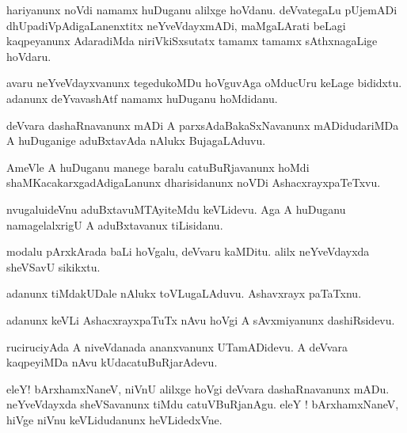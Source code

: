 \documentclass{article}
\begin{document}
\begin{mn}%
hariyanunx noVdi namamx huDuganu alilxge hoVdanu. deVvategaLu pUjemADi 
dhUpadiVpAdigaLanenxtitx neYveVdayxmADi, maMgaLArati beLagi kaqpeyanunx  AdaradiMda 
niriVkiSxsutatx tamamx tamamx sAthxnagaLige hoVdaru.
\end{mn}

\begin{mn}%
avaru neYveVdayxvanunx tegedukoMDu hoVguvAga oMducUru keLage bididxtu. adanunx 
deYvavashAtf  namamx huDuganu hoMdidanu.
\end{mn}

\begin{mn}%
deVvara dashaRnavanunx mADi A parxsAdaBakaSxNavanunx mADidudariMDa A huDuganige 
aduBxtavAda nAlukx BujagaLAduvu.
\end{mn}

\begin{mn}%
AmeVle A huDuganu manege baralu catuBuRjavanunx hoMdi shaMKacakarxgadAdigaLanunx 
dharisidanunx noVDi AshacxrayxpaTeTxvu.
\end{mn}

\begin{mn}%
nvugaluideVnu aduBxtavuMTAyiteMdu keVLidevu. Aga A huDuganu namagelalxrigU A aduBxtavanux 
tiLisidanu.
\end{mn}

\begin{mn}%
modalu pArxkArada baLi hoVgalu, deVvaru kaMDitu. alilx neYveVdayxda sheVSavU sikikxtu.
\end{mn}

\begin{mn}%
adanunx tiMdakUDale nAlukx toVLugaLAduvu. Ashavxrayx paTaTxnu.
\end{mn}

\begin{mn}%
adanunx keVLi AshacxrayxpaTuTx nAvu hoVgi A sAvxmiyanunx dashiRsidevu.
\end{mn}

\begin{mn}%
ruciruciyAda A niveVdanada ananxvanunx UTamADidevu. A deVvara kaqpeyiMDa nAvu 
kUdacatuBuRjarAdevu.
\end{mn}

\begin{mn}%
eleY! bArxhamxNaneV, niVnU alilxge hoVgi deVvara dashaRnavanunx mADu. neYveVdayxda 
sheVSavanunx tiMdu catuVBuRjanAgu. eleY ! bArxhamxNaneV, hiVge niVnu keVLidudanunx 
heVLidedxVne.
\end{mn}
\end{document}
